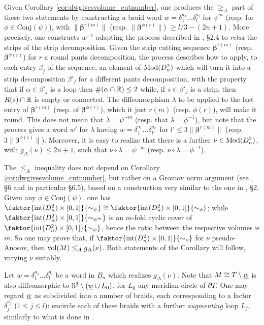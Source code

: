 Given Corollary \ref{cor:dwgivesvolume_cutnumber}, one produces the $\geq_A$ part of these two statements by constructing a braid word $w=\delta_1^{a_1}\ldots\delta_l^{a_l}$ for $\psi^m$ (resp. for $\phi\in \mathrm{Conj}(\psi)$), with $\|\bm\beta^{r(m)}\|$ (resp. $\|\bm\beta^{\phi(r)}\|$) $\geq l/3-(2n+1)$. More precisely, one constructs $w^{-1}$ adapting the process described in \cite{dynnikovwiest}, \S 2.4 to \emph{relax} the strips of the strip decomposition. Given the strip cutting sequence $\bm\beta^{r(m)}$ (resp. $\bm\beta^{\phi(r)}$) for $r$ a round pants decomposition, the process describes how to apply, to each entry $\beta_j$ of the sequence, an element of $\mathrm{Mod}(D^2_n)$ which will turn it into a strip decomposition $\beta'_j$ for a different pants decomposition, with the property that if $\alpha\in \beta'_j$ is a loop then $\#(\alpha\cap\mathbb R)\leq 2$ while, if $s\in \beta'_j$ is a strip, then $R(s)\cap\mathbb R$ is empty or connected. The diffeomorphism $\lambda$ to be applied to the last entry of $\bm\beta^{r(m)}$ (resp. of $\bm\beta^{\phi(r)}$), which it just $r(m)$ (resp. $\phi(r)$), will make it round. This does not mean that $\lambda=\psi^{-m}$ (resp. that $\lambda=\phi^{-1}$), but note that the process gives a word $w'$ for $\lambda$ having $w=\delta_1^{a_1}\ldots\delta_{l'}^{a_{l'}}$ for $l' \leq 3\|\bm\beta^{r(m)}\|$ (resp. $3\|\bm\beta^{\phi(r)}\|$). Moreover, it is easy to realize that there is a further $\nu\in\mathrm{Mod}(D^2_n)$, with $g_\Delta(\nu)\leq 2n+1$, such that $\nu\circ\lambda=\psi^{-m}$ (resp. $\nu\circ\lambda=\phi^{-1}$).

The $\leq_A$ inequality does not depend on Corollary \ref{cor:dwgivesvolume_cutnumber}, but rather on a Gromov norm argument (see \cite{thurstonnotes}, \S 6 and in particular \S 6.5), based on a construction very similar to the one in \cite{lackenby}, \S 2. Given any $\phi\in\mathrm{Conj}(\psi)$, one has $\faktor{\inte(D^2_n)\times [0,1]}{\sim_\psi}\cong \faktor{\inte(D^2_n)\times [0,1]}{\sim_\phi}$; while $\faktor{\inte(D^2_n)\times [0,1]}{\sim_{\psi^m}}$ is an $m$-fold cyclic cover of $\faktor{\inte(D^2_n)\times [0,1]}{\sim_\psi}$, hence the ratio between the respective volumes is $m$. So one may prove that, if $\faktor{\inte(D^2_n)\times [0,1]}{\sim_\nu}$ for $\nu$ pseudo-Anosov, then $\mathrm{vol}(M) \leq_{A} g_\Delta(\nu)$. Both statements of the Corollary will follow, varying $\nu$ suitably.

Let $w=\delta_1^{a_1}\ldots \delta_l^{a_l}$ be a word in $B_n$ which realizes $g_\Delta(\nu)$. Note that $M\cong T\setminus\underline{w}$ is also diffeomorphic to $\mathbb S^3\setminus (\underline{w}\cup L_0)$, for $L_0$ any meridian circle of $\partial\bar T$. One may regard $\underline{w}$ as subdivided into a number of braids, each corresponding to a factor $\delta_j^{a_j}$ ($1\leq j\leq l$): encircle each of these braids with a further \emph{augmenting} loop $L_j$, similarly to what is done in \cite{lackenby}.

